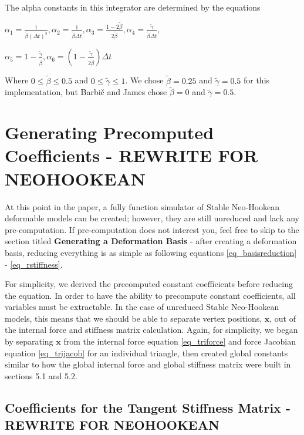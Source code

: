 \documentclass[twocolumn,10pt]{asme2ej}
\begin{document}
\bigskip
The alpha constants in this integrator are determined by the equations

\begin{center}
$\alpha_1 = \frac{1}{\tilde{\beta}(\Delta t)^2}, \alpha_2 = \frac{1}{\tilde{\beta}\Delta t},
\alpha_3 = \frac{1 - 2\tilde{\beta}}{2\tilde{\beta}}, \alpha_4 = \frac{\tilde{\gamma}}{\tilde{\beta}\Delta t},$

$\alpha_5 = 1 - \frac{\tilde{\gamma}}{\tilde{\beta}}, \alpha_6 = \left(1 - \frac{\tilde{\gamma}}{2\tilde{\beta}}\right)\Delta t$
\end{center}

Where $0 \leq \tilde{\beta} \leq 0.5$ and $0 \leq \tilde{\gamma} \leq 1$. We chose $\tilde{\beta} = 0.25$ and $\tilde{\gamma} = 0.5$ for this implementation, but Barbič and James chose $\tilde{\beta} = 0$ and $\tilde{\gamma} = 0.5$.

\section{Generating Precomputed Coefficients - REWRITE FOR NEOHOOKEAN}

At this point in the paper, a fully function simulator of Stable Neo-Hookean deformable models can be created; however, they are still unreduced and lack any pre-computation. If pre-computation does not interest you, feel free to skip to the section titled \textbf{Generating a Deformation Basis} - after creating a deformation basis, reducing everything is as simple as following equations \ref{eq_basisreduction} - \ref{eq_rstiffness}.

For simplicity, we derived the precomputed constant coefficients before reducing the equation. In order to have the ability to precompute constant coefficients, all variables must be extractable. In the case of unreduced Stable Neo-Hookean models, this means that we should be able to separate vertex positions, $\bm{x}$, out of the internal force and stiffness matrix calculation. Again, for simplicity, we began by separating $\bm{x}$ from the internal force equation \ref{eq_triforce} and force Jacobian equation \ref{eq_trijacob} for an individual triangle, then created global constants similar to how the global internal force and global stiffness matrix were built in sections 5.1 and 5.2.

\subsection{Coefficients for the Tangent Stiffness Matrix  - REWRITE FOR NEOHOOKEAN}
\end{document}

